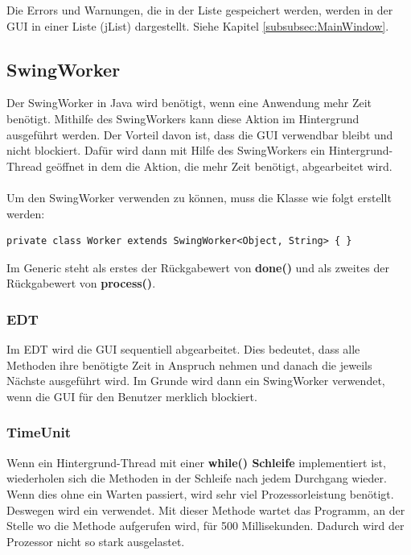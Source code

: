 Die Errors und Warnungen, die in der Liste gespeichert werden, werden in der GUI in einer Liste (jList) dargestellt. Siehe Kapitel \ref{subsubsec:MainWindow}. 

\subsection{SwingWorker}
Der SwingWorker in Java wird benötigt, wenn eine Anwendung mehr Zeit benötigt. Mithilfe des SwingWorkers kann diese Aktion im Hintergrund ausgeführt werden. Der Vorteil davon ist, dass die GUI verwendbar bleibt und nicht blockiert. Dafür wird dann mit Hilfe des SwingWorkers ein Hintergrund-Thread geöffnet in dem die Aktion, die mehr Zeit benötigt, abgearbeitet wird.
\\ \\ Um den SwingWorker verwenden zu können, muss die Klasse wie folgt erstellt werden:
\begin{lstlisting}[style=JavaStyle, caption=SwingWorker Klasse erstellen]
	private class Worker extends SwingWorker<Object, String> { } 
\end{lstlisting}
Im Generic steht als erstes der Rückgabewert von \textbf{done()} und als zweites der Rückgabewert von \textbf{process()}.

\subsubsection{EDT}
Im \ac{EDT} wird die GUI sequentiell abgearbeitet. Dies bedeutet, dass alle Methoden ihre benötigte Zeit in Anspruch nehmen und danach die jeweils Nächste ausgeführt wird. Im Grunde wird dann ein SwingWorker verwendet, wenn die GUI für den Benutzer merklich blockiert. 

\subsubsection{TimeUnit}
Wenn ein Hintergrund-Thread mit einer \textbf{while() Schleife} implementiert ist, wiederholen sich die Methoden in der Schleife nach jedem Durchgang wieder. Wenn dies ohne ein Warten passiert, wird sehr viel Prozessorleistung benötigt. Deswegen wird ein  verwendet. Mit dieser Methode wartet das Programm, an der Stelle wo die Methode aufgerufen wird, für 500 Millisekunden. Dadurch wird der Prozessor nicht so stark ausgelastet. 

